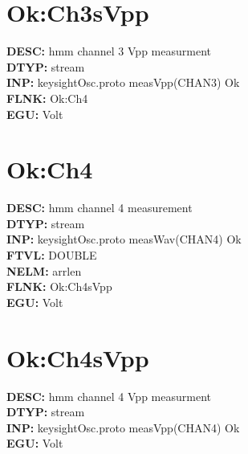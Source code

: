 \documentclass[12pt]{article}
\begin{document}
\section{Ok:Ch3sVpp}
\textbf{DESC: }hmm channel 3 Vpp measurment \\
\textbf{DTYP: }stream \\
\textbf{INP: }keysightOsc.proto measVpp(CHAN3) Ok \\
\textbf{FLNK: }Ok:Ch4 \\
\textbf{EGU: }Volt \\
\newpage
\section{Ok:Ch4}
\textbf{DESC: }hmm channel 4 measurement \\
\textbf{DTYP: }stream \\
\textbf{INP: }keysightOsc.proto measWav(CHAN4) Ok \\
\textbf{FTVL: }DOUBLE \\
\textbf{NELM: }arrlen \\
\textbf{FLNK: }Ok:Ch4sVpp \\
\textbf{EGU: }Volt \\
\newpage
\section{Ok:Ch4sVpp}
\textbf{DESC: }hmm channel 4 Vpp measurment \\
\textbf{DTYP: }stream \\
\textbf{INP: }keysightOsc.proto measVpp(CHAN4) Ok \\
\textbf{EGU: }Volt \\
\newpage
\end{document}
